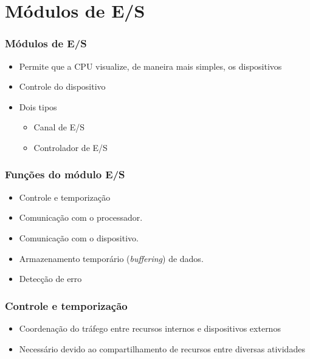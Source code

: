 \documentclass[aspectratio=169,
				xcolor=table]{beamer}
\begin{document}
	\section{Módulos de E/S}
	
	\begin{frame}
		\frametitle{Módulos de E/S}
		
		\begin{itemize}
			\item Permite que a CPU visualize, de maneira mais simples, os dispositivos
			\vspace{1em}
			\item Controle do dispositivo
			\vspace{1em}
			\item Dois tipos
			\begin{itemize}
				\item Canal de E/S 
				\item Controlador de E/S
			\end{itemize}
		\end{itemize}
	\end{frame}
	
	\begin{frame}
		\frametitle{Funções do módulo E/S}
		\begin{itemize}
			\item Controle e temporização
			\vspace{1em}
			\item Comunicação com o
			\vspace{1em} processador.
			\item Comunicação com o dispositivo.
			\vspace{1em}
			\item Armazenamento temporário (\textit{buffering}) de dados.
			\vspace{1em}
			\item Detecção de erro
		\end{itemize}
	\end{frame}
	
	\begin{frame}
		\frametitle{Controle e temporização}
		\begin{itemize}
			\item Coordenação do tráfego entre recursos internos e dispositivos externos
			\vspace{1em}
			\item Necessário devido ao compartilhamento de recursos entre diversas atividades
		\end{itemize}
	\end{frame}
	
\end{document}

